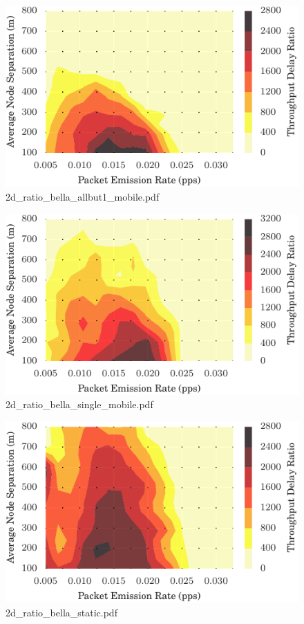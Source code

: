 \documentclass{article}
\begin{document}
\begin{figure}[h!]
\centering
\includegraphics[width=\linewidth]{2d_ratio_bella_allbut1_mobile.pdf}
\caption{2d\_ratio\_bella\_allbut1\_mobile.pdf}
\end{figure}




\begin{figure}[h!]
\centering
\includegraphics[width=\linewidth]{2d_ratio_bella_single_mobile.pdf}
\caption{2d\_ratio\_bella\_single\_mobile.pdf}
\end{figure}




\begin{figure}[h!]
\centering
\includegraphics[width=\linewidth]{2d_ratio_bella_static.pdf}
\caption{2d\_ratio\_bella\_static.pdf}
\end{figure}
\end{document}
